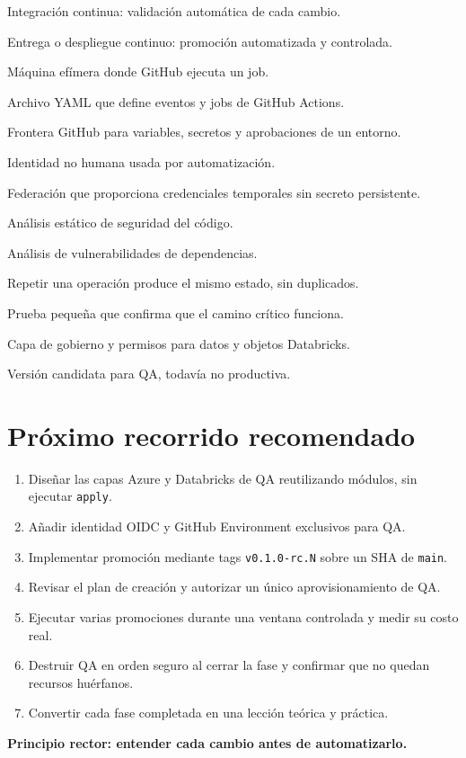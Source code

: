 \documentclass[11pt,a4paper]{article}
\begin{document}
\begin{description}[style=nextline,leftmargin=2em]
  \item[CI] Integración continua: validación automática de cada cambio.
  \item[CD] Entrega o despliegue continuo: promoción automatizada y controlada.
  \item[Runner] Máquina efímera donde GitHub ejecuta un job.
  \item[Workflow] Archivo YAML que define eventos y jobs de GitHub Actions.
  \item[Environment] Frontera GitHub para variables, secretos y aprobaciones de un entorno.
  \item[Service principal] Identidad no humana usada por automatización.
  \item[OIDC] Federación que proporciona credenciales temporales sin secreto persistente.
  \item[SAST] Análisis estático de seguridad del código.
  \item[SCA] Análisis de vulnerabilidades de dependencias.
  \item[Idempotencia] Repetir una operación produce el mismo estado, sin duplicados.
  \item[Smoke test] Prueba pequeña que confirma que el camino crítico funciona.
  \item[Unity Catalog] Capa de gobierno y permisos para datos y objetos Databricks.
  \item[Release candidate] Versión candidata para QA, todavía no productiva.
\end{description}

\section{Próximo recorrido recomendado}

\begin{enumerate}
  \item Diseñar las capas Azure y Databricks de QA reutilizando módulos, sin ejecutar \texttt{apply}.
  \item Añadir identidad OIDC y GitHub Environment exclusivos para QA.
  \item Implementar promoción mediante tags \texttt{v0.1.0-rc.N} sobre un SHA de \texttt{main}.
  \item Revisar el plan de creación y autorizar un único aprovisionamiento de QA.
  \item Ejecutar varias promociones durante una ventana controlada y medir su costo real.
  \item Destruir QA en orden seguro al cerrar la fase y confirmar que no quedan recursos huérfanos.
  \item Convertir cada fase completada en una lección teórica y práctica.
\end{enumerate}

\vfill
\begin{center}
  \color{dbcyan}\textbf{Principio rector: entender cada cambio antes de automatizarlo.}
\end{center}
\end{document}
